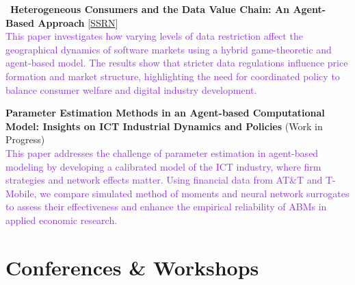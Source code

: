 \documentclass[a4paper,12pt]{article}
\begin{document}
\textbullet\ \textbf{Heterogeneous Consumers and the Data Value Chain: An Agent-Based Approach} [\href{https://papers.ssrn.com/sol3/papers.cfm?abstract_id=5235196}{SSRN}]\\ [1.5ex]
\textcolor{BlueViolet}{This paper investigates how varying levels of data restriction affect the geographical dynamics of software markets using a hybrid game-theoretic and agent-based model. The results show that stricter data regulations influence price formation and market structure, highlighting the need for coordinated policy to balance consumer welfare and digital industry development.}

\textbullet \;\textbf{Parameter Estimation Methods in an Agent-based Computational Model: Insights on ICT Industrial Dynamics and Policies} (Work in Progress)\\ [1.5ex]
\textcolor{BlueViolet}{This paper addresses the challenge of parameter estimation in agent-based modeling by developing a calibrated model of the ICT industry, where firm strategies and network effects matter. Using financial data from AT\&T and T-Mobile, we compare simulated method of moments and neural network surrogates to assess their effectiveness and enhance the empirical reliability of ABMs in applied economic research.}

\section{Conferences \& Workshops}







\end{document}
